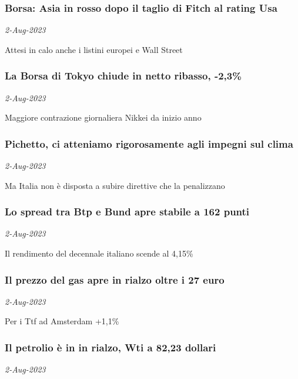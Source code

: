\subsubsection{Borsa: Asia in rosso dopo il taglio di Fitch al rating Usa \href{https://www.ansa.it/sito/notizie/economia/2023/08/02/borsa-asia-in-rosso-dopo-il-taglio-di-fitch-al-rating-usa_19ecf72a-44bf-4bc5-a614-fa78c8cf3031.html}{}}
\textit{2-Aug-2023}

Attesi in calo anche i listini europei e Wall Street
\subsubsection{La Borsa di Tokyo chiude in netto ribasso, -2,3\% \href{https://www.ansa.it/sito/notizie/economia/2023/08/02/la-borsa-di-tokyo-chiude-in-netto-ribasso-23_28c9fd03-bc35-46f6-bcfa-1ca64829e594.html}{}}
\textit{2-Aug-2023}

Maggiore contrazione giornaliera Nikkei da inizio anno
\subsubsection{Pichetto, ci atteniamo rigorosamente agli impegni sul clima \href{https://www.ansa.it/sito/notizie/economia/2023/08/02/pichetto-ci-atteniamo-rigorosamente-agli-impegni-sul-clima_aa81cf42-038e-43f7-afae-65f0410b91d8.html}{}}
\textit{2-Aug-2023}

Ma Italia non \`{e} disposta a subire direttive che la penalizzano
\subsubsection{Lo spread tra Btp e Bund apre stabile a 162 punti \href{https://www.ansa.it/sito/notizie/economia/2023/08/02/lo-spread-tra-btp-e-bund-apre-stabile-a-162-punti_41ac37ab-f451-458b-93b2-3f1e8a86e078.html}{}}
\textit{2-Aug-2023}

Il rendimento del decennale italiano scende al 4,15\%
\subsubsection{Il prezzo del gas apre in rialzo oltre i 27 euro \href{https://www.ansa.it/sito/notizie/economia/2023/08/02/il-prezzo-del-gas-apre-in-rialzo-oltre-i-27-euro_df80468a-ae37-4d30-ab19-129500628e78.html}{}}
\textit{2-Aug-2023}

Per i Ttf ad Amsterdam +1,1\%
\subsubsection{Il petrolio \`{e} in in rialzo, Wti a 82,23 dollari \href{https://www.ansa.it/sito/notizie/economia/2023/08/02/il-petrolio-e-in-in-rialzo-wti-a-8223-dollari_e088831d-01c6-46b9-94f4-2e54861ea0af.html}{}}
\textit{2-Aug-2023}


